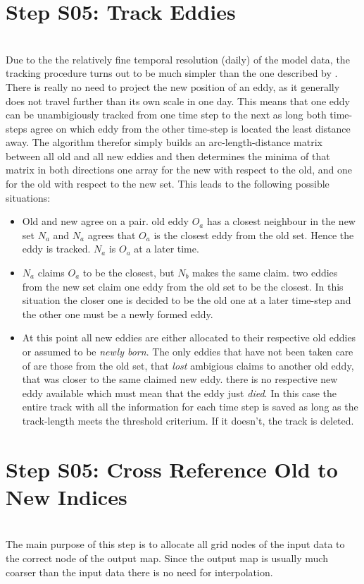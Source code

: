 \section{Step S05: Track Eddies} \label{S:05}
\\
Due to the the relatively fine temporal resolution (daily) of the model data,
the tracking procedure turns out to be much simpler than the one described by
\cite{Chelton2007}. There is really no need to project the new position of an
eddy, as it generally does not travel further than its own scale in one day.
This means that one eddy can be unambigiously tracked from one time step to the
next as long both time-steps agree on which eddy from the other
time-step is located the least distance away.
The algorithm therefor simply builds an arc-length-distance matrix
between all old and all new eddies and then determines the minima of that
matrix in both directions \ie one array for the new with respect to the old,
and one for the old with respect to the new set. This leads to the following
possible situations:
\begin{itemize}
	\item 
	Old and new agree on a pair. \Ie old eddy $O_a$ has a closest neighbour in
the new set $N_a$ and $N_a$ agrees that $O_a$ is the closest eddy from the old
set. Hence the eddy is tracked.  $N_a$ is $O_a$ at a later time.
\item
$N_a$ claims $O_a$ to be the closest, but $N_b$ makes the same claim. \Ie two
eddies from the new set claim one eddy from the old set to be the closest. 
In this situation the closer one is decided to be the old one at a later
time-step and the other one must be a newly formed eddy.
\item 
At this point all new eddies are either allocated to their respective old
eddies or assumed to be \textit{newly born}. The only eddies that have not been
taken care of are those from the old set, that \textit{lost} ambigious claims to
another old eddy, that was closer to the same claimed new eddy. \Ie there is no
respective new eddy available which must mean that the eddy just \textit{died}.
In this case the entire track with all the information for each time step is
saved as long as the track-length meets the threshold criterium. If it doesn't,
the track is deleted. 
\end{itemize}

\section{Step S05: Cross Reference Old to New Indices}
\\
The main purpose of this step is to allocate all grid nodes of the input data
to the correct node of the output map. Since the output map is usually much
coarser than the input data there is no need for interpolation.  

